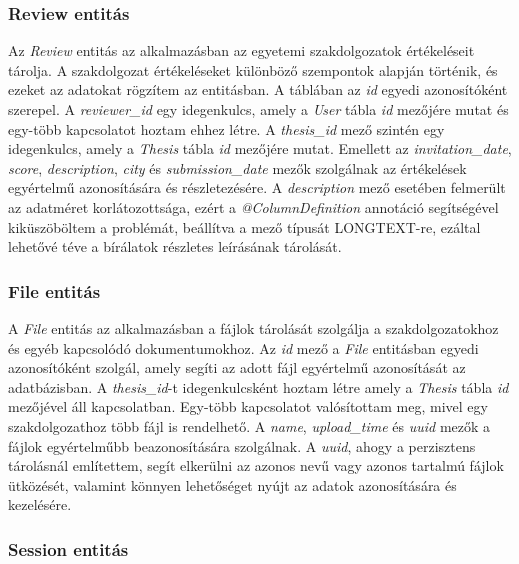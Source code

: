 \subsubsection{Review entitás}

Az \textit{Review} entitás az alkalmazásban az egyetemi szakdolgozatok értékeléseit tárolja. A szakdolgozat értékeléseket különböző szempontok alapján történik, és ezeket az adatokat rögzítem az entitásban. A táblában az \textit{id} egyedi azonosítóként szerepel. A \textit{reviewer\_id} egy idegenkulcs, amely a \textit{User} tábla \textit{id} mezőjére mutat és egy-több kapcsolatot hoztam ehhez létre. A \textit{thesis\_id} mező szintén egy idegenkulcs, amely a \textit{Thesis} tábla \textit{id} mezőjére mutat. Emellett az \textit{invitation\_date}, \textit{score}, \textit{description}, \textit{city} és \textit{submission\_date} mezők szolgálnak az értékelések egyértelmű azonosítására és részletezésére. A \textit{description} mező esetében felmerült az adatméret korlátozottsága, ezért a \textit{@ColumnDefinition} annotáció segítségével kiküszöböltem a problémát, beállítva a mező típusát LONGTEXT-re, ezáltal lehetővé téve a bírálatok részletes leírásának tárolását.

\subsubsection{File entitás}

A \textit{File} entitás az alkalmazásban a fájlok tárolását szolgálja a szakdolgozatokhoz és egyéb kapcsolódó dokumentumokhoz. Az \textit{id} mező a \textit{File} entitásban egyedi azonosítóként szolgál, amely segíti az adott fájl egyértelmű azonosítását az adatbázisban. A \textit{thesis\_id}-t idegenkulcsként hoztam létre amely a \textit{Thesis} tábla \textit{id} mezőjével áll kapcsolatban. Egy-több kapcsolatot valósítottam meg, mivel egy szakdolgozathoz több fájl is rendelhető. A \textit{name}, \textit{upload\_time} és \textit{uuid} mezők a fájlok egyértelműbb beazonosítására szolgálnak. A \textit{uuid}, ahogy a perzisztens tárolásnál említettem, segít elkerülni az azonos nevű vagy azonos tartalmú fájlok ütközését, valamint könnyen lehetőséget nyújt az adatok azonosítására és kezelésére.

\subsubsection{Session entitás}

